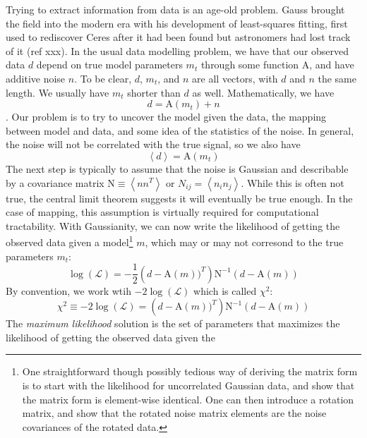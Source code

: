 \documentclass[12]{article}
\begin{document}
Trying to extract information from data is an age-old problem.  Gauss
brought the field into the modern era with his development of
least-squares fitting, first used to rediscover Ceres after it had
been found but astronomers had lost track of it (ref xxx).  In the
usual data modelling problem, we have that our observed data $d$
depend on true model parameters $m_t$ through some function $\mathrm{A}$, and
have additive noise $n$.  To be clear, $d$, $m_t$, and $n$ are all
vectors, with $d$ and $n$ the same length.  We usually have $m_t$
shorter than $d$ as well.  Mathematically, we have 
\begin{equation}
d=\mathrm{A}(m_t)+n
\end{equation}
.  Our problem is to try to uncover the model given the
data, the mapping between model and data, and some idea of the
statistics of the noise.  In general, the noise will not be correlated
with the true signal, so we also have
\begin{equation}
\left <d\right >=\mathrm{A}(m_t)
\end{equation}
The next step is typically to assume that the noise is Gaussian and
describable by a covariance matrix $\mathrm{N} \equiv \left <n n^T
\right >$ or $N_{ij}=\left <n_in_j \right >$.  While this is often not
true, the central limit theorem suggests it will eventually be true
enough.  In the case of mapping, this assumption is virtually required
for computational tractability.  With Gaussianity, we can now write
the likelihood of getting the observed data given a model\footnote{One
  straightforward though possibly tedious way of deriving the matrix
  form is to start with the likelihood for uncorrelated Gaussian data,
  and show that the matrix form is element-wise identical.  One can
  then introduce a rotation matrix, and show that the rotated noise matrix
  elements are the noise covariances of the rotated data.} $m$, which may
or may not corresond to the true parameters $m_t$:
\begin{equation}
\log(\mathcal{L})=-\frac{1}{2} \left (d-\mathrm{A}(m))^T\right )
\mathrm{N}^{-1} \left (d-\mathrm{A}(m) \right )
\end{equation}
By convention, we work wtih $-2\log(\mathcal{L})$ which is called
$\chi^2$:
\begin{equation}
\chi^2 \equiv -2\log(\mathcal{L})= \left (d-\mathrm{A}(m))^T\right )
\mathrm{N}^{-1} \left (d-\mathrm{A}(m) \right )
\end{equation}
The {\textit{maximum likelihood}} solution is the set of parameters
that maximizes the likelihood of getting the observed data given the
\end{document}
